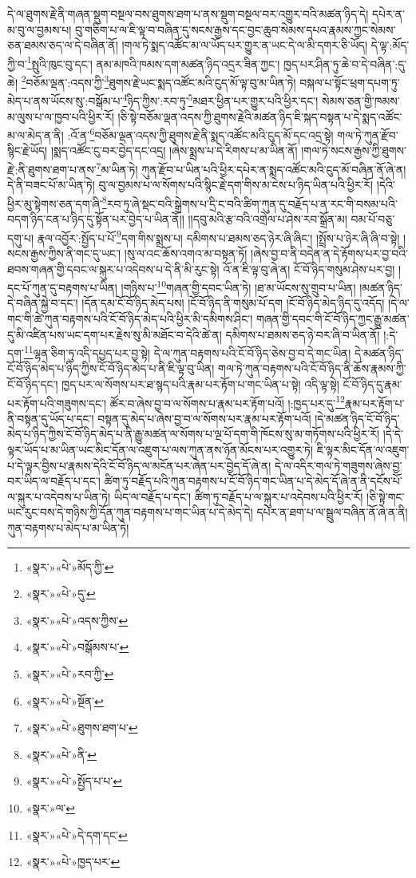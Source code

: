 དེ་ལ་ཐུགས་རྗེ་ནི་གཞན་སྡུག་བསྔལ་བས་ཐུགས་ཐག་པ་ནས་སྡུག་བསྔལ་བར་འགྱུར་བའི་མཚན་ཉིད་དེ། དཔེར་ན་མ་བུ་ལ་བྱམས་པ། བུ་གཅིག་པ་ལ་ཇི་ལྟ་བ་བཞིན་དུ་སངས་རྒྱས་དང་བྱང་ཆུབ་སེམས་དཔའ་རྣམས་ཀྱང་སེམས་ཅན་ཐམས་ཅད་ལ་དེ་བཞིན་ནོ། །གལ་ཏེ་སྨད་འཚོང་མ་ལ་ཡོད་པར་གྱུར་ན་ཡང་དེ་ལ་མི་དགར་ཅི་ཡོད། དེ་ལྟ་:མོད་ཀྱི་བ་\footnote{«སྣར་»«པེ་»མོད་ཀྱི་}སྤུའི་ཁུང་བུ་དང་། ནམ་མཁའི་ཁམས་དག་མཚན་ཉིད་འདྲར་ཟིན་ཀྱང་། ཁྱད་པར་ཤིན་ཏུ་ཆེ་བ་དེ་བཞིན་:དུ་ཆེ། \footnote{«སྣར་»«པེ་»དུ་}བཅོམ་ལྡན་:འདས་ཀྱི་\footnote{«སྣར་»«པེ་»འདས་ཀྱིས་}ཐུགས་རྗེ་ཡང་སྨད་འཚོང་མའི་ངུད་མོ་ལྟ་བུ་མ་ཡིན་ཏེ། བསྐལ་པ་སྟོང་ཕྲག་དཔག་ཏུ་མེད་པ་ནས་ཡོངས་སུ་:བསྒོམ་པ་\footnote{«སྣར་»«པེ་»བསྒོམས་པ་}ཉིད་ཀྱིས་:རབ་ཏུ་\footnote{«སྣར་»«པེ་»རབ་ཀྱི་}མཐར་ཕྱིན་པར་གྱུར་པའི་ཕྱིར་དང་། སེམས་ཅན་གྱི་ཁམས་མ་ལུས་པ་ལ་ཁྱབ་པའི་ཕྱིར་རོ། །ཅི་སྟེ་བཅོམ་ལྡན་འདས་ཀྱི་ཐུགས་རྗེའི་མཚན་ཉིད་ཇི་སྐད་བསྟན་པ་དེ་སྨད་འཚོང་མ་ལ་མེད་ན་ནི། :འོ་ན་\footnote{«སྣར་»«པེ་»སྔོན་}བཅོམ་ལྡན་འདས་ཀྱི་ཐུགས་རྗེ་ནི་སྨད་འཚོང་མའི་ངུད་མོ་དང་འདྲ་སྟེ། གལ་ཏེ་ཀུན་རྫོབ་སྙིང་རྗེ་ཡོད། །སྨད་འཚོང་ངུ་བར་བྱེད་དང་འདྲ། །ཞེས་སྨྲས་པ་དེ་རིགས་པ་མ་ཡིན་ནོ། །གལ་ཏེ་སངས་རྒྱས་ཀྱི་ཐུགས་རྗེ་:ནི་ཐུགས་ཐག་པ་ནས་\footnote{«སྣར་»«པེ་»ཐུགས་ཐག་པ་}མ་ཡིན་ཏེ། ཀུན་རྫོབ་པ་ཡིན་པའི་ཕྱིར་དཔེར་ན་སྨད་འཚོང་མའི་ངུད་མོ་བཞིན་ནོ་ཞེ་ན། དེ་ནི་བཟང་པོ་མ་ཡིན་ཏེ། བུ་ལ་བྱམས་པ་ལ་སོགས་པའི་སྙིང་རྗེ་དག་གིས་མ་ངེས་པ་ཉིད་ཡིན་པའི་ཕྱིར་རོ། །དེའི་ཕྱིར་མུ་སྟེགས་ཅན་དག་ཞི་\footnote{«སྣར་»«པེ་»ནི་}རབ་ཏུ་ཞེ་སྡང་བའི་སྒྲེགས་པ་དྲི་ང་བའི་ཚིག་ཀུན་དུ་བརྗོད་པ་ན་རང་གི་བསམ་པའི་བདག་ཉིད་ངན་པ་ཉིད་དུ་སྟོན་པར་བྱེད་པ་ཡིན་ནོ།། །།དབུ་མའི་རྩ་བའི་འགྲེལ་པ་ཤེས་རབ་སྒྲོན་མ། བམ་པོ་བཅུ་དགུ་པ། རྣལ་འབྱོར་:སྤྱོད་པ་པོ་\footnote{«སྣར་»«པེ་»སྤྱོད་པ་པ་}དག་གིས་སྨྲས་པ། དམིགས་པ་ཐམས་ཅད་ཉེར་ཞི་ཞིང་། །སྤྲོས་པ་ཉེར་ཞི་ཞི་བ་སྟེ། །སངས་རྒྱས་ཀྱིས་ནི་གང་དུ་ཡང་། །སུ་ལ་འང་ཆོས་འགའ་མ་བསྟན་ཏོ། །ཞེས་བྱ་བ་ནི་བདེན་ན་དེ་རྟོགས་པར་བྱ་བའི་ཐབས་གཞན་གྱི་དབང་ལ་སྐུར་པ་འདེབས་པ་དེ་ནི་མི་རུང་སྟེ། འོ་ན་ཇི་ལྟ་བུ་ཞེ་ན། ངོ་བོ་ཉིད་གསུམ་ཤེས་པར་བྱ། །དང་པོ་ཀུན་དུ་བརྟགས་པ་ཡིན། །གཉིས་པ་\footnote{«སྣར་»ལ་}གཞན་གྱི་དབང་ཡིན་ཏེ། །ཐ་མ་ཡོངས་སུ་གྲུབ་པ་ཡིན། །མཚན་ཉིད་དེ་བཞིན་སྐྱེ་བ་དང་། །དོན་དམ་ངོ་བོ་ཉིད་མེད་པས། །ངོ་བོ་ཉིད་ནི་གསུམ་པོ་དག །ངོ་བོ་ཉིད་མེད་ཉིད་དུ་འདོད། །དེ་ལ་གང་གི་ཚེ་ཀུན་བརྟགས་པའི་ངོ་བོ་ཉིད་མེད་པའི་ཕྱིར་མི་དམིགས་ཤིང་། གཞན་གྱི་དབང་གི་ངོ་བོ་ཉིད་ཀྱང་རྒྱུ་མཚན་དུ་མི་འཛིན་པས་ཡང་དག་པར་རྗེས་སུ་མི་མཐོང་བ་དེའི་ཚེ་ན། དམིགས་པ་ཐམས་ཅད་ཉེ་བར་ཞི་བ་ཡིན་ནོ། །:དེ་དག་\footnote{«སྣར་»«པེ་»དེ་དག་དང་}ལྷན་ཅིག་ཏུ་འདི་དཔྱད་པར་བྱ་སྟེ། དེ་ལ་ཀུན་བརྟགས་པའི་ངོ་བོ་ཉིད་ཅེས་བྱ་བ་དེ་གང་ཡིན། དེ་མཚན་ཉིད་ངོ་བོ་ཉིད་མེད་པ་ཉིད་ཀྱིས་ངོ་བོ་ཉིད་མེད་པ་ནི་ཇི་ལྟ་བུ་ཡིན། གལ་ཏེ་ཀུན་བརྟགས་པའི་ངོ་བོ་ཉིད་ནི་ཆོས་རྣམས་ཀྱི་ངོ་བོ་ཉིད་དང་། ཁྱད་པར་ལ་སོགས་པར་ཐ་སྙད་པའི་རྣམ་པར་རྟོག་པ་གང་ཡིན་པ་སྟེ། འདི་ལྟ་སྟེ། ངོ་བོ་ཉིད་དུ་རྣམ་པར་རྟོག་པའི་གཟུགས་དང་། ཚོར་བ་ཞེས་བྱ་བ་ལ་སོགས་པ་རྣམ་པར་རྟོག་པའོ། །:ཁྱད་པར་དུ་\footnote{«སྣར་»«པེ་»ཁྱད་པར་}རྣམ་པར་རྟོག་པ་ནི་བསྟན་དུ་ཡོད་པ་དང་། བསྟན་དུ་མེད་པ་ཞེས་བྱ་བ་ལ་སོགས་པར་རྣམ་པར་རྟོག་པའོ། །དེ་མཚན་ཉིད་ངོ་བོ་ཉིད་མེད་པ་ཉིད་ཀྱིས་ངོ་བོ་ཉིད་མེད་པ་ནི་རྒྱུ་མཚན་ལ་སོགས་པ་ལྔ་པོ་དག་གི་ཁོངས་སུ་མ་གཏོགས་པའི་ཕྱིར་རོ། །དེ་དེ་ལྟར་ཡོད་པ་མ་ཡིན་ཡང་མིང་དོན་ལ་འཇུག་པ་ལས་ཀུན་ནས་ཉོན་མོངས་པར་འགྱུར་ཏེ། ཇི་ལྟར་མིང་དོན་ལ་འཇུག་པ་དེ་ལྟར་བྱིས་པ་རྣམས་དེའི་ངོ་བོ་ཉིད་ལ་མངོན་པར་ཞེན་པར་བྱེད་དོ་ཞེ་ན། དེ་ལ་འདིར་གལ་ཏེ་གཟུགས་ཞེས་བྱ་བར་ཡིད་ལ་བརྗོད་པ་དང་། ཚིག་ཏུ་བརྗོད་པའི་ཀུན་བརྟགས་པ་ངོ་བོ་ཉིད་གང་ཡིན་པ་དེ་མེད་དོ་ཞེ་ན་ནི་དངོས་པོ་ལ་སྐུར་པ་འདེབས་པ་ཡིན་ཏེ། ཡིད་ལ་བརྗོད་པ་དང་། ཚིག་ཏུ་བརྗོད་པ་ལ་སྐུར་པ་འདེབས་པའི་ཕྱིར་རོ། །ཅི་སྟེ་གང་ཡང་རུང་བས་དེ་གཉིས་ཀྱི་དོན་ཀུན་བརྟགས་པ་གང་ཡིན་པ་དེ་མེད་དེ། དཔེར་ན་ཐག་པ་ལ་སྦྲུལ་བཞིན་ནོ་ཞེ་ན་ནི། ཀུན་བརྟགས་པ་མེད་པ་མ་ཡིན་ཏེ། 